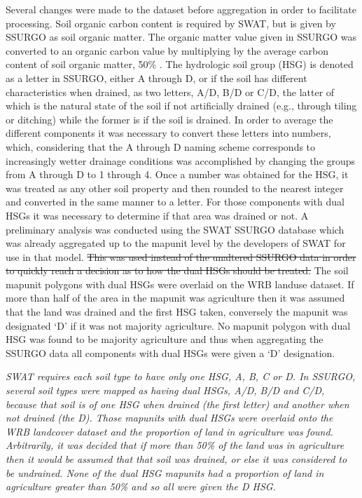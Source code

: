 \documentclass[10pt,letterpaper]{article}%
\begin{document}
		Several changes were made to the dataset before aggregation in order to facilitate processing. Soil organic carbon content is required by SWAT, but is given by SSURGO as soil organic matter. The organic matter value given in SSURGO was converted to an organic carbon value by multiplying by the average carbon content of soil organic matter, 50\% \citep{brady_introsoils_2002}. The hydrologic soil group (HSG) is denoted as a letter in SSURGO, either A through D, or if the soil has different characteristics when drained, as two letters, A/D, B/D or C/D, the latter of which is the natural state of the soil if not artificially drained (e.g., through tiling or ditching) while the former is if the soil is drained. In order to average the different components it was necessary to convert these letters into numbers, which, considering that the A through D naming scheme corresponds to increasingly wetter drainage conditions was accomplished by changing the groups from A through D to 1 through 4. Once a number was obtained for the HSG, it was treated as any other soil property and then rounded to the nearest integer and converted in the same manner to a letter. For those components with dual HSGs it was necessary to determine if that area was drained or not. A preliminary analysis was conducted using the SWAT SSURGO database which was already aggregated up to the mapunit level by the developers of SWAT for use in that model. \st{This was used instead of the unaltered SSURGO data in order to quickly reach a decision as to how the dual HSGs should be treated.} The soil mapunit polygons with dual HSGs were overlaid on the WRB landuse dataset. If more than half of the area in the mapunit was agriculture then it was assumed that the land was drained and the first HSG taken, conversely the mapunit was designated `D' if it was not majority agriculture. No mapunit polygon with dual HSG was found to be majority agriculture and thus when aggregating the SSURGO data all components with dual HSGs were given a `D' designation.
		
		\textit{SWAT requires each soil type to have only one HSG, A, B, C or D. In SSURGO, several soil types were mapped as having dual HSGs, A/D, B/D and C/D, because that soil is of one HSG when drained (the first letter) and another when not drained (the D). Those mapunits with dual HSGs were overlaid onto the WRB landcover dataset and the proportion of land in agriculture was found. Arbitrarily, it was decided that if more than 50\% of the land was in agriculture then it would be assumed that that soil was drained, or else it was considered to be undrained. None of the dual HSG mapunits had a proportion of land in agriculture greater than 50\% and so all were given the D HSG.} 
		
\end{document}
